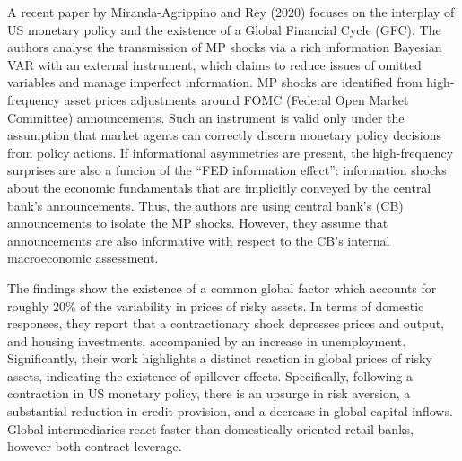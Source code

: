 \documentclass[11pt,a4paper]{article}
\begin{document}
A recent paper by Miranda-Agrippino and Rey (2020) focuses on the interplay of US monetary policy and the existence of a Global Financial Cycle (GFC). 
The authors analyse the transmission of MP shocks via a rich information Bayesian VAR with an external instrument, which claims to reduce issues of omitted variables and manage imperfect information. 
MP shocks are identified from high-frequency asset prices adjustments around FOMC (Federal Open Market Committee) announcements. 
Such an instrument is valid only under the assumption that market agents can correctly discern monetary policy decisions from policy actions. If informational asymmetries are present, the high-frequency surprises are also a funcion of the \enquote{FED information effect}: information shocks about the economic fundamentals that are implicitly conveyed by the central bank's announcements. 
Thus, the authors are using central bank's (CB) announcements to isolate the MP shocks. However, they assume that announcements are also informative with respect to the CB's internal macroeconomic assessment. 


The findings show the existence of a common global factor which accounts for roughly 20\% of the variability in prices of risky assets. 
In terms of domestic responses, they report that a contractionary shock depresses prices and output, and housing investments, accompanied by an increase in unemployment.
Significantly, their work highlights a distinct reaction in global prices of risky assets, indicating the existence of spillover effects.
Specifically, following a contraction in US monetary policy, there is an upsurge in risk aversion, a substantial reduction in credit provision, and a decrease in global capital inflows. Global intermediaries react faster than domestically oriented retail banks, however both contract leverage.
\end{document}
